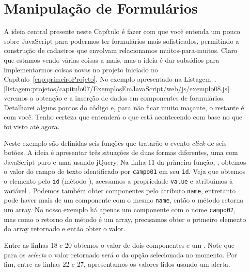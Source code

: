 \section{Manipulação de Formulários}

A ideia central presente neste Capítulo é fazer com que você entenda um pouco sobre JavaScript para podermos ter formulários mais sofisticados, permitindo a construção de cadastros que envolvam relacionamos muitos-para-muitos. Claro que estamos vendo várias coisas a mais, mas a ideia é dar subsídios para implementarmos coisas novas no projeto iniciado no Capítulo~\ref{cap:primeiroProjeto}. No exemplo apresentado na Listagem~\thechapter.\ref{listagem:projetos/capitulo07/ExemplosEmJavaScript/web/js/exemplo08.js} veremos a obtenção e a inserção de dados em componentes de formulários. Detalharei alguns pontos do código e, para não ficar muito maçante, o restante é com você. Tenho certeza que entenderá o que está acontecendo com base no que foi visto até agora.


Neste exemplo são definidas seis funções que tratarão o evento \textit{click} de seis botões. A ideia é apresentar três situações de duas formas diferentes, uma com JavaScript puro e uma usando jQuery. Na linha 11 da primeira função, , obtemos o valor do campo de texto identificado por \texttt{campo01} em seu \texttt{id}. Veja que obtemos o elemento pelo \texttt{id} (método ), acessamos a propriedade \texttt{value} e atribuímos à variável . Podemos também obter componentes pelo atributo \texttt{name}, entretanto pode haver mais de um componente com o mesmo \texttt{name}, então o método  retorna um array. No nosso exemplo há apenas um componente com o nome \texttt{campo02}, mas como o retorno do método  é um array, precisamos obter o primeiro elemento do array retornado e então obter o valor.

Entre as linhas 18 e 20 obtemos o valor de dois componentes  e um . Note que para os \textit{selects} o valor retornado será o da opção selecionada no momento. Por fim, entre as linhas 22 e 27, apresentamos os valores lidos usando um alerta.

